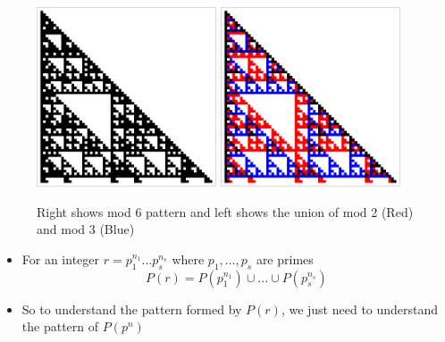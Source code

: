 \documentclass{beamer}
\begin{document}
\begin{frame}
    \begin{figure}
        \centering
        \includegraphics[width=0.475\textwidth]{Mod6.pdf}
        \hfill
        \includegraphics[width=0.475\textwidth]{mod2,3.pdf}
        \caption{Right shows mod 6 pattern and left shows the union of mod 2 (Red) and mod 3 (Blue)}
    \end{figure}
\end{frame}

\begin{frame}
    \begin{itemize}
        \item For an integer $r = p_1^{n_1}\dots p_s^{n_s}$ where $p_1,\dots,p_s$ are primes
        \begin{equation*}
            P(r) = P(p_1^{n_1}) \cup ... \cup P(p_s^{n_s})
        \end{equation*}
        \item So to understand the pattern formed by $P(r)$, we just need to understand the pattern of $P(p^n)$
    \end{itemize}
\end{frame}
\end{document}
